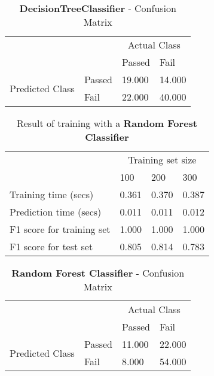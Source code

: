 \documentclass[12pt]{article}
\begin{document}
\setlength{\extrarowheight}{1.5pt}
\begin{table}[!htbp]
\caption{\textbf{DecisionTreeClassifier} - Confusion Matrix} %
\centering %
\begin{tabular}{ |l|l|p{3cm}|p{3cm}| }
\hline %
\multirow{2}{*}{} & & \multicolumn{2}{c|}{Actual Class} \\ 
\cline{3-4}
\multirow{2}{*}{} & & Passed & Fail \\ 
\hline
\multirow{2}{1.5in}{Predicted Class} & Passed & 19.000 & 14.000 \\ 
 & Fail & 22.000 & 40.000  \\ \hline
\end{tabular}
\label{decisionTreeConfusionMatrix}
\end{table}

\setlength{\extrarowheight}{1.5pt}
\begin{table}[!htbp]
\caption{Result of training with a \textbf{Random Forest Classifier}} %
\centering %
\begin{tabular}{|p{6cm}|p{1.5cm}|p{1.5cm}|p{1.5cm}|} %
\hline %
& \multicolumn{3}{c|}{Training set size}\\[5pt]
\cline{2-4} 
& 100 & 200 & 300\\[0.5ex]
\hline %

Training time (secs)   &       0.361 & 0.370 & 0.387 \\
Prediction time (secs)   &     0.011 & 0.011 & 0.012 \\
F1 score for training set  &   1.000 & 1.000 & 1.000 \\
F1 score for test set    &     0.805 & 0.814 & 0.783 \\
\hline %
\end{tabular}
\label{randomForestClassifierTable}
\end{table}

\setlength{\extrarowheight}{1.5pt}
\begin{table}[!htbp]
\caption{\textbf{Random Forest Classifier} - Confusion Matrix} %
\centering %
\begin{tabular}{ |l|l|p{3cm}|p{3cm}| }
\hline %
\multirow{2}{*}{} & & \multicolumn{2}{c|}{Actual Class} \\ 
\cline{3-4}
\multirow{2}{*}{} & & Passed & Fail \\ 
\hline
\multirow{2}{1.5in}{Predicted Class} & Passed & 11.000 & 22.000  \\ 
 & Fail & 8.000 & 54.000  \\ \hline
\end{tabular}
\end{table}
\end{document}
